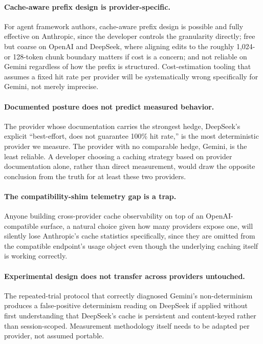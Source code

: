\documentclass[11pt]{article}
\begin{document}
\paragraph{Cache-aware prefix design is provider-specific.} For agent
framework authors, cache-aware prefix design is possible and fully
effective on Anthropic, since the developer controls the granularity
directly; free but coarse on OpenAI and DeepSeek, where aligning edits to
the roughly 1{,}024- or 128-token chunk boundary matters if cost is a
concern; and not reliable on Gemini regardless of how the prefix is
structured. Cost-estimation tooling that assumes a fixed hit rate per
provider will be systematically wrong specifically for Gemini, not merely
imprecise.

\paragraph{Documented posture does not predict measured behavior.} The
provider whose documentation carries the strongest hedge, DeepSeek's
explicit ``best-effort, does not guarantee 100\% hit rate,'' is the most
deterministic provider we measure. The provider with no comparable hedge,
Gemini, is the least reliable. A developer choosing a caching strategy
based on provider documentation alone, rather than direct measurement,
would draw the opposite conclusion from the truth for at least these two
providers.

\paragraph{The compatibility-shim telemetry gap is a trap.} Anyone
building cross-provider cache observability on top of an
OpenAI-compatible surface, a natural choice given how many providers
expose one, will silently lose Anthropic's cache statistics specifically,
since they are omitted from the compatible endpoint's usage object even
though the underlying caching itself is working correctly.

\paragraph{Experimental design does not transfer across providers
untouched.} The repeated-trial protocol that correctly diagnosed Gemini's
non-determinism produces a false-positive determinism reading on DeepSeek
if applied without first understanding that DeepSeek's cache is
persistent and content-keyed rather than session-scoped. Measurement
methodology itself needs to be adapted per provider, not assumed portable.
\end{document}
